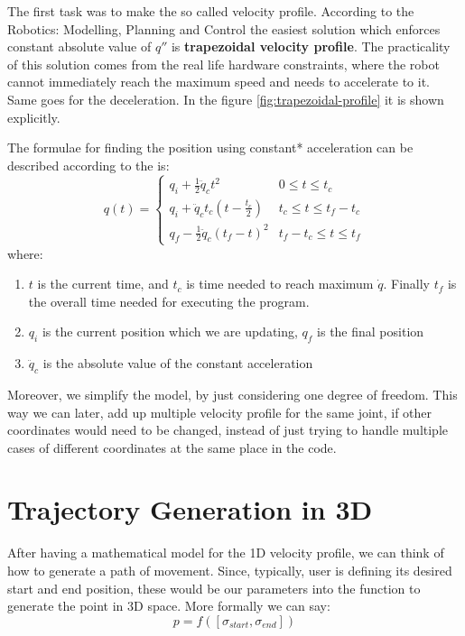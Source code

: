 The first task was to make the so called velocity profile. According to the Robotics: Modelling, Planning and Control \parencite{robotics_book} the easiest solution which enforces constant absolute value of $q''$  is \textbf{trapezoidal velocity profile}. The practicality of this solution comes from the real life hardware constraints, where the robot cannot immediately reach the maximum speed and needs to accelerate to it. Same goes for the deceleration. In the figure \autoref{fig:trapezoidal-profile} it is shown explicitly. 

The formulae for finding the position using constant* acceleration can be described according to the \parencite{robotics_book} is: 
\[
q(t) = \begin{cases}
    q_i + \frac{1}{2} \ddot{q}_c t^2 &  0 \le t \le t_c \\
    q_i + \ddot{q}_c t_c \left( t - \frac{t_c}{2} \right) &  t_c \le t \le t_f - t_c \\
    q_f - \frac{1}{2} \ddot{q}_c (t_f - t)^2 & t_f - t_c \le t \le t_f
\end{cases}
\] 
where: 

\begin{enumerate}
    \item $t$ is the current time, and $t_c$  is time needed to reach maximum $\dot{q}$. Finally $t_f$ is the overall time needed for executing the program.
    \item $q_i$ is the current position which we are updating, $q_f$ is the final position
    \item  $\ddot{q}_c$ is the absolute value of the constant acceleration
\end{enumerate}

Moreover, we simplify the model, by just considering one degree of freedom. This way we can later, add up multiple velocity profile for the same joint, if other coordinates would need to be changed, instead of just trying to handle multiple cases of different coordinates at the same place in the code. 

\section{Trajectory Generation in 3D}

After having a mathematical model for the 1D velocity profile, we can think of how to generate a path of movement. Since, typically, user is defining its desired start and end position, these would be our parameters into the function to generate the point in 3D space. More formally we can say: 
$$
p = f([ \sigma_{start}, \sigma_{end} ])
$$

